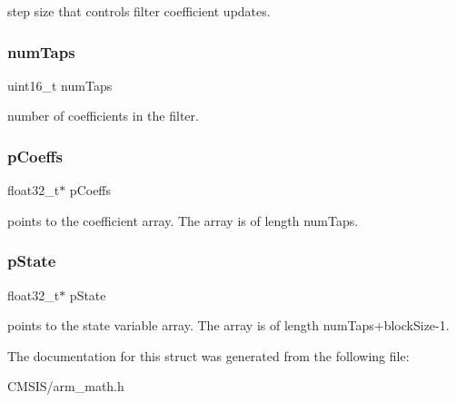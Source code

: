 step size that controls filter coefficient updates. \mbox{\label{structarm__lms__instance__f32_a751941891e47f522a7f5375fe8990aac}} 
\subsubsection{\texorpdfstring{numTaps}{numTaps}}
{\footnotesize\ttfamily uint16\+\_\+t num\+Taps}

number of coefficients in the filter. \mbox{\label{structarm__lms__instance__f32_aacbb8dd8eeba4b21fc2bb40076405ee3}} 
\subsubsection{\texorpdfstring{pCoeffs}{pCoeffs}}
{\footnotesize\ttfamily float32\+\_\+t$\ast$ p\+Coeffs}

points to the coefficient array. The array is of length num\+Taps. \mbox{\label{structarm__lms__instance__f32_a335c87e6fdc4b96601d95a5de8b9c463}} 
\subsubsection{\texorpdfstring{pState}{pState}}
{\footnotesize\ttfamily float32\+\_\+t$\ast$ p\+State}

points to the state variable array. The array is of length num\+Taps+block\+Size-\/1. 

The documentation for this struct was generated from the following file\+:\begin{DoxyCompactItemize}
\item 
C\+M\+S\+I\+S/arm\+\_\+math.\+h\end{DoxyCompactItemize}
